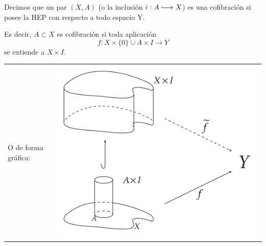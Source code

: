 \begin{defin}
Decimos que un par $(X,A)$ (o la inclusión $i: A \longhookrightarrow X$) es una cofibración si posee la HEP con respecto a todo espacio Y. \par 
Es decir, $A \subset X$ es cofibración si toda aplicación  
\[ f : X \times \{0\} \cup A \times I \longrightarrow Y \]
se extiende a $X \times I$. \par
\begin{tabular}{ll}
\begin{minipage}{0.5\textwidth}
O de forma gráfica: 
\end{minipage}
&
\begin{minipage}{0.5\textwidth}
\includegraphics[width=0.7\linewidth]{images/cofibrac}
\end{minipage}
\end{tabular}

\end{defin}

